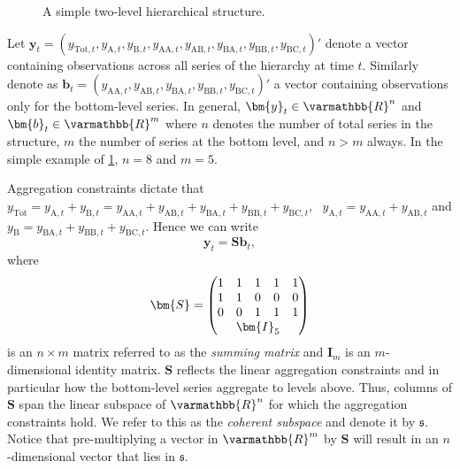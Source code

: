{\begin{figure}[!hbt]\sidecaption[t]\centering
	\caption{A simple two-level hierarchical structure.}
	\label{fig:simple tree}
\end{figure}

Let $\bm{y}_t = (y_{\text{Tot},t},y_{\text{A},t}, y_{\text{B},t},y_{\text{AA},t}, y_{\text{AB},t}, y_{\text{BA},t}, y_{\text{BB},t},y_{\text{BC},t})'$ denote a vector containing observations across all series of the hierarchy at time $t$. Similarly denote as $\bm{b}_t = (y_{\text{AA},t}, y_{\text{AB},t}, y_{\text{BA},t}, y_{\text{BB},t}, y_{\text{BC},t})'$ a vector containing observations only for the bottom-level series. In general, $\bm{y}_t\in \varmathbb{R}^n$ and $\bm{b}_t \in \varmathbb{R}^m$ where $n$ denotes the number of total series in the structure, $m$ the number of series at the bottom level, and $n>m$ always. In the simple example of \ref{fig:simple tree}, $n=8$ and $m=5$.

Aggregation constraints dictate that $y_{\text{Tot}}=y_{\text{A},t}+y_{\text{B},t}=y_{\text{AA},t}+y_{\text{AB},t}+y_{\text{BA},t}+y_{\text{BB},t}+y_{\text{BC},t}$,~ $y_{\text{A},t}=y_{\text{AA},t}+y_{\text{AB},t}$ and $y_{\text{B}}=y_{\text{BA},t}+y_{\text{BB},t}+y_{\text{BC},t}$. Hence we can write
\begin{equation}\label{eq:summing matrix}
	\bm{y}_t = \bm{Sb}_t,
\end{equation}
where \begin{equation*}
	\bm{S} = \begin{pmatrix}
		1 & 1                            & 1 & 1 & 1 \\
		1 & 1                            & 0 & 0 & 0 \\
		0 & 0                            & 1 & 1 & 1 \\
		  & \multicolumn{3}{c}{\bm{I}_5} &
	\end{pmatrix}
\end{equation*}
is an $n\times m$ matrix referred to as the \textit{summing matrix} and $\bm{I}_m$ is an $m$-dimensional identity matrix. $\bm{S}$ reflects the linear aggregation constraints and in particular how the bottom-level series aggregate to levels above. Thus, columns of $\bm{S}$ span the linear subspace of $\varmathbb{R}^n$ for which the aggregation constraints hold. We refer to this as the \textit{coherent subspace} and denote it by $\mathfrak{s}$. Notice that pre-multiplying a vector in $\varmathbb{R}^m$ by $\bm{S}$ will result in an $n$-dimensional vector that lies in $\mathfrak{s}$.

}
